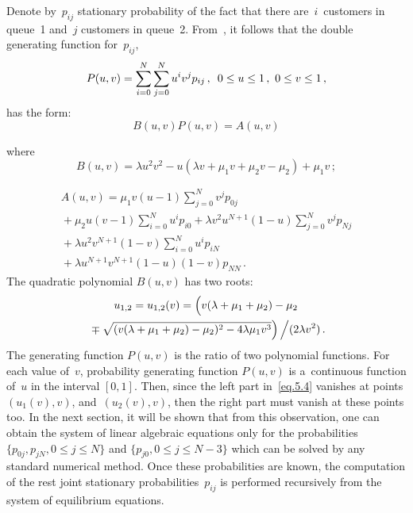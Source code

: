 \begin{multicols}{2}
Denote by~$p_{ij}$ stationary probability of the fact that
there are~$i$~customers in queue~1 and~$j$ customers in queue~2.
From~\cite{orig1}, it follows that 
the double generating function for~$p_{ij}$,
$$
P(u,v)
=
\sum\limits_{i=0}^N \sum\limits_{j=0}^N  u^i v^j p_{ij}\,,  \enskip 
0 \le u \le 1\,, \ 0 \le v \le 1\,,
$$
has the form:
\begin{equation}
\label{eq.5.4}
B(u,v) P(u,v)= A(u,v)
 \end{equation}



\noindent
where
$$
B(u,v)=\lambda u^2 v^2 - u(\lambda v+\mu_1 v+ \mu_2 v-\mu_2)+\mu_1 v\,;
$$

\vspace*{-12pt}

\noindent
\begin{multline*}
A(u,v)= \mu_1 v \left( u-1 \right)\sum\limits_{j=0}^N v^j p_{0j}\\
{}+
\mu_2 u \left(v-1\right) \sum\limits_{i=0}^N  u^i p_{i0}
+ \lambda v^2 u^{N+1}(1-u)  \sum\limits_{j=0}^N  v^j p_{Nj}
\\
{}+
\lambda u^2 v^{N+1}(1-v)\sum\limits_{i=0}^N u^i p_{iN} \\
{}+
\lambda u^{N+1}v^{N+1}(1-u)(1-v)p_{NN}\,.
\end{multline*}
The quadratic polynomial $B(u,v)$ has two roots:
\begin{multline*}
u_{1,2}=u_{1,2}(v)=\left(
\vphantom{\sqrt{(v(\lambda+\mu_1 + \mu_2)-\mu_2)^2-4 \lambda \mu_1 v^3  }}
v(\lambda+\mu_1 + \mu_2)- \mu_2 \right.\\
\left.{}
\mp \sqrt{(v(\lambda+\mu_1 + \mu_2)-\mu_2)^2-4 \lambda \mu_1 v^3  }\right)\Big / 
(2\lambda v^2)\,.
\end{multline*}
The generating function $P(u,v)$ is the ratio of two polynomial functions.
For each value of~$v$, probability generating function $P(u,v)$ is 
a~continuous function of~$u$
in the interval $[0,1]$.
Then, since the left part in~\eqref{eq.5.4}
vanishes at points $(u_1(v),v)$, and~$(u_2(v),v)$,
then the right part must vanish at these points too.
In the next section, it will be shown that 
from this observation, one can obtain the system 
of linear algebraic equations only for the probabilities 
$\{p_{0j},p_{jN}, 0 \le j \le N\}$ 
and $\{p_{j0}, 0 \le j \le N-3 \}$ which 
can be solved by any standard numerical method. Once these probabilities 
are known, the computation of the rest joint stationary probabilities~$p_{ij}$ 
is performed recursively from the system of equilibrium equations.
{

}
\end{multicols}
